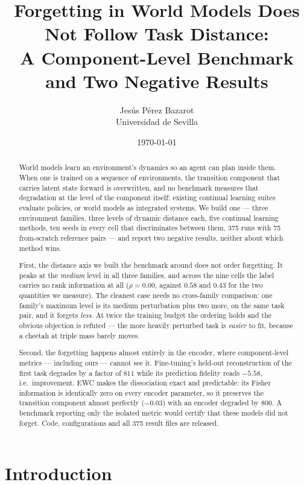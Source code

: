 \documentclass[11pt]{article}
\title{Forgetting in World Models Does Not Follow Task Distance:\\
       \large A Component-Level Benchmark and Two Negative Results}
\author{Jes\'us P\'erez Bazarot\\ Universidad de Sevilla}
\date{\today}
\begin{document}
\maketitle

\begin{abstract}
World models learn an environment's dynamics so an agent can plan inside them.
When one is trained on a sequence of environments, the transition component
that carries latent state forward is overwritten, and no benchmark measures
that degradation at the level of the component itself: existing continual
learning suites evaluate policies, or world models as integrated systems. We
build one --- three environment families, three levels of dynamic distance
each, five continual learning methods, ten seeds in every cell that
discriminates between them, 375 runs with 75 from-scratch reference pairs ---
and report two negative results, neither about which method wins.

First, the distance axis we built the benchmark around does not order
forgetting. It peaks at the \emph{medium} level in all three families, and
across the nine cells the label carries no rank information at all
($\rho = 0.00$, against $0.58$ and $0.43$ for the two quantities we measure).
The cleanest case needs no cross-family comparison: one family's maximum level
is its medium perturbation plus two more, on the same task pair, and it forgets
\emph{less}. At twice the training budget the ordering holds and the obvious
objection is refuted --- the more heavily perturbed task is \emph{easier} to
fit, because a cheetah at triple mass barely moves.

Second, the forgetting happens almost entirely in the encoder, where
component-level metrics --- including ours --- cannot see it. Fine-tuning's
held-out reconstruction of the first task degrades by a factor of $811$ while
its prediction fidelity reads $-5.58$, i.e.\ improvement. EWC makes the
dissociation exact and predictable: its Fisher information is identically zero
on every encoder parameter, so it preserves the transition component almost
perfectly ($-0.03$) with an encoder degraded by $800$. A benchmark reporting
only the isolated metric would certify that these models did not forget.
Code, configurations and all 375 result files are released.
\end{abstract}

\section{Introduction}
\label{sec:intro}
\end{document}
